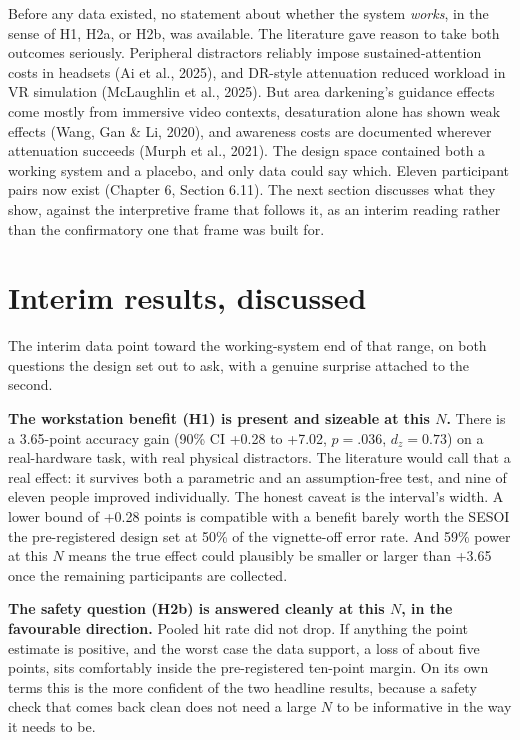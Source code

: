 Before any data existed, no statement about whether the system \textit{works}, in the sense of H1,
H2a, or H2b, was available. The literature gave reason to take both outcomes seriously. Peripheral
distractors reliably impose sustained-attention costs in headsets (Ai et al., 2025), and DR-style
attenuation reduced workload in VR simulation (McLaughlin et al., 2025). But area darkening's guidance
effects come mostly from immersive video contexts, desaturation alone has shown weak effects (Wang,
Gan \& Li, 2020), and awareness costs are documented wherever attenuation succeeds (Murph et al.,
2021). The design space contained both a working system and a placebo, and only data could say which.
Eleven participant pairs now exist (Chapter 6, Section 6.11). The next section discusses what they
show, against the interpretive frame that follows it, as an interim reading rather than the
confirmatory one that frame was built for.

\section{Interim results, discussed}

The interim data point toward the working-system end of that range, on both questions the design set
out to ask, with a genuine surprise attached to the second.

\textbf{The workstation benefit (H1) is present and sizeable at this $N$.} There is a 3.65-point
accuracy gain (90\% CI +0.28 to +7.02, $p = .036$, $d_z = 0.73$) on a real-hardware task, with real
physical distractors. The literature would call that a real effect: it survives both a parametric and
an assumption-free test, and nine of eleven people improved individually. The honest caveat is the
interval's width. A lower bound of +0.28 points is compatible with a benefit barely worth the SESOI
the pre-registered design set at 50\% of the vignette-off error rate. And 59\% power at this $N$ means
the true effect could plausibly be smaller or larger than +3.65 once the remaining participants are
collected.

\textbf{The safety question (H2b) is answered cleanly at this $N$, in the favourable direction.}
Pooled hit rate did not drop. If anything the point estimate is positive, and the worst case the data
support, a loss of about five points, sits comfortably inside the pre-registered ten-point margin. On
its own terms this is the more confident of the two headline results, because a safety check that
comes back clean does not need a large $N$ to be informative in the way it needs to be.

